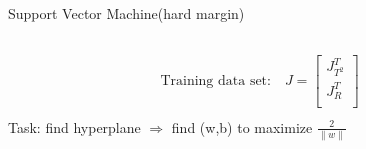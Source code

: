 \documentclass[10pt]{beamer}
\newcommand{\norm}[1]{\left\lVert#1\right\rVert}
\begin{document}
\begin{frame}{Support Vector Machine(hard margin)}
\begin{columns}
        \begin{column}{0.5\textwidth}
           \begin{equation} \nonumber
           \begin{aligned}
             \text{Training data set:} \quad J = \begin{bmatrix}
                   J_{T^2}^T \\
                   J_R^T \\
                   \end{bmatrix} \\
           \end{aligned}
           \end{equation}
           Task: find hyperplane $\Rightarrow$ find (w,b) to maximize $\frac{2}{\norm{w}}$
         

\end{column}
\end{columns}
\end{frame}
\end{document}
